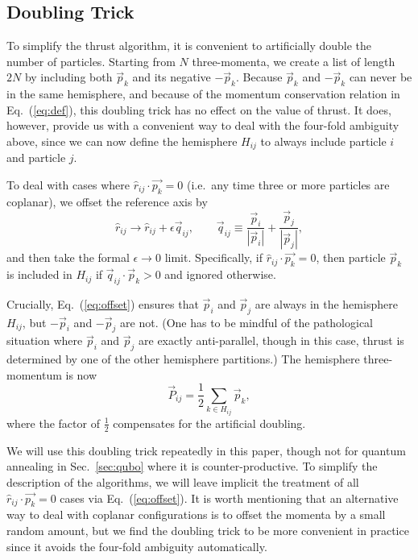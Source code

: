 \documentclass[aps,prd,twocolumn,superscriptaddress,preprintnumbers,nofootinbib,longbibliography,floatfix]{revtex4-1}
\DeclareRobustCommand{\Sec}[1]{Sec.~\ref{#1}}
\DeclareRobustCommand{\Eq}[1]{Eq.~(\ref{#1})}
\begin{document}
\subsection{Doubling Trick}
\label{sec:doubling}

To simplify the thrust algorithm, it is convenient to artificially double the number of particles.
%
Starting from $N$ three-momenta, we create a list of length $2N$ by including both $\vec{p}_k$ and its negative $-\vec{p}_k$.
%
Because $\vec{p}_k$ and $-\vec{p}_k$ can never be in the same hemisphere, and because of the momentum conservation relation in \Eq{eq:def}, this doubling trick has no effect on the value of thrust.
%
It does, however, provide us with a convenient way to deal with the four-fold ambiguity above, since we can now define the hemisphere $H_{ij}$ to always include particle $i$ and particle $j$.


To deal with cases where $\hat{r}_{ij} \cdot \vec{p_k} = 0$ (i.e.~any time three or more particles are coplanar), we offset the reference axis by
%
\begin{equation}
\label{eq:offset}
\hat{r}_{ij} \to \hat{r}_{ij} + \epsilon \vec{q}_{ij}, \qquad  \vec{q}_{ij} \equiv \frac{\vec{p}_i}{|\vec{p}_i|} +  \frac{\vec{p}_j}{|\vec{p}_j|},
\end{equation}
%
and then take the formal $\epsilon \to 0$ limit.
%
Specifically, if $\hat{r}_{ij} \cdot \vec{p_k} = 0$, then particle $\vec{p}_k$ is included in $H_{ij}$ if $\vec{q}_{ij} \cdot \vec{p}_k > 0$ and ignored otherwise.


Crucially, \Eq{eq:offset} ensures that $\vec{p}_i$ and $\vec{p}_j$ are always in the hemisphere $H_{ij}$, but $-\vec{p}_i$ and $-\vec{p}_j$ are not.
%
(One has to be mindful of the pathological situation where $\vec{p}_i$ and $\vec{p}_j$ are exactly anti-parallel, though in this case, thrust is determined by one of the other hemisphere partitions.)
%
The hemisphere three-momentum is now
%
\begin{equation}
\label{eq:Pij}
\vec{P}_{ij} = \frac{1}{2}\sum_{k \in H_{ij}} \vec{p}_k,
\end{equation}
%
where the factor of $\frac{1}{2}$ compensates for the artificial doubling.


We will use this doubling trick repeatedly in this paper, though not for quantum annealing in \Sec{sec:qubo} where it is counter-productive.
%
To simplify the description of the algorithms, we will leave implicit the treatment of all $\hat{r}_{ij} \cdot \vec{p_k} = 0$ cases via \Eq{eq:offset}.
%
It is worth mentioning that an alternative way to deal with coplanar configurations is to offset the momenta by a small random amount, but we find the doubling trick to be more convenient in practice since it avoids the four-fold ambiguity automatically.
\end{document}
